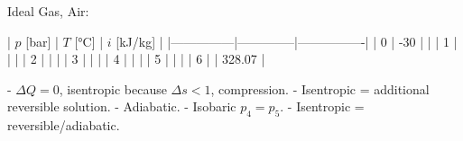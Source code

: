 Ideal Gas, Air:  

| \( p \) [bar] | \( T \) [°C] | \( i \) [kJ/kg] |  
|---------------|--------------|----------------|  
| 0             | -30          |                |  
| 1             |              |                |  
| 2             |              |                |  
| 3             |              |                |  
| 4             |              |                |  
| 5             |              |                |  
| 6             |              | 328.07         |  

- \( \Delta Q = 0 \), isentropic because \( \Delta s < 1 \), compression.  
- Isentropic = additional reversible solution.  
- Adiabatic.  
- Isobaric \( p_4 = p_5 \).  
- Isentropic = reversible/adiabatic.
